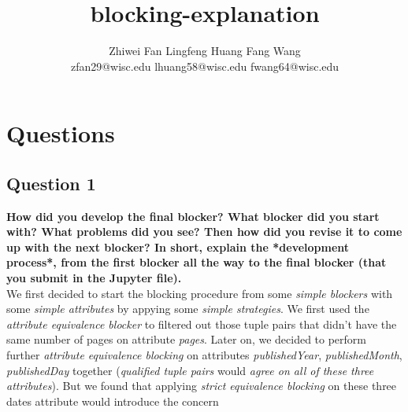 \documentclass[10pt, oneside]{article}
\title{\textbf{blocking-explanation}}
\author{Zhiwei Fan\hspace{7ex}
	   Lingfeng Huang\hspace{7ex}
	   Fang Wang\\
	   zfan29@wisc.edu\hspace{3ex}
	   lhuang58@wisc.edu\hspace{3ex}
	   fwang64@wisc.edu
	   }
\begin{document}
\maketitle 

\section*{Questions}

\subsection*{Question 1}
\textbf{How did you develop the final blocker? What blocker did you start with? What problems did you see? Then how did you revise it to come up with the next blocker? In short, explain the *development process*, from the first blocker all the way to the final blocker (that you submit in the Jupyter file).}
\vspace{1ex}
\\
We first decided to start the blocking procedure from some \textit{simple blockers} with some \textit{simple attributes} by appying some \textit{simple strategies}. We first used the \textit{attribute equivalence blocker} to filtered out those 
tuple pairs that didn't have the same number of pages on attribute \textit{pages}. Later on, we decided to perform further \textit{attribute equivalence blocking} on attributes \textit{publishedYear}, \textit{publishedMonth}, 
\textit{publishedDay} together (\textit{qualified tuple pairs} would \textit{agree on all of these three attributes}). But we found that applying \textit{strict equivalence blocking} on these three dates attribute would introduce the concern
\end{document}
